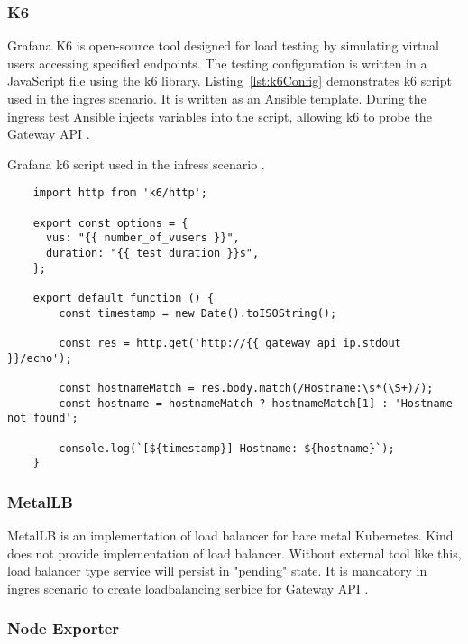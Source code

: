 \subsubsection{K6}
\label{sec:k6}

Grafana K6 is open-source tool designed for load testing by simulating virtual users accessing specified endpoints. The testing configuration is written in a JavaScript file using the k6 library. Listing~\ref{lst:k6Config} demonstrates k6 script used in the ingres scenario. It is written as an Ansible template. During the ingress test Ansible injects variables into the script, allowing k6 to probe the Gateway API \cite{AnsibleTemplates}.


\begin{listing}[H]
  \centering
  \caption{Grafana k6 script used in the infress scenario \cite{K6HTTP}.}
  \begin{verbatim}
    import http from 'k6/http';

    export const options = {
      vus: "{{ number_of_vusers }}",
      duration: "{{ test_duration }}s",
    };

    export default function () {
        const timestamp = new Date().toISOString();

        const res = http.get('http://{{ gateway_api_ip.stdout }}/echo');

        const hostnameMatch = res.body.match(/Hostname:\s*(\S+)/);
        const hostname = hostnameMatch ? hostnameMatch[1] : 'Hostname not found';

        console.log(`[${timestamp}] Hostname: ${hostname}`);
    }
  \end{verbatim}
  \label{lst:k6Config}
\end{listing}

\subsubsection{MetalLB}
\label{sec:metallb}

MetalLB is an implementation of load balancer for bare metal Kubernetes. Kind does not provide implementation of load balancer. Without external tool like this, load balancer type service will persist in "pending" state. It is mandatory in ingres scenario to create loadbalancing serbice for Gateway API \cite{MetalLB}.

\subsubsection{Node Exporter}
\label{sec:nodeExporter}

